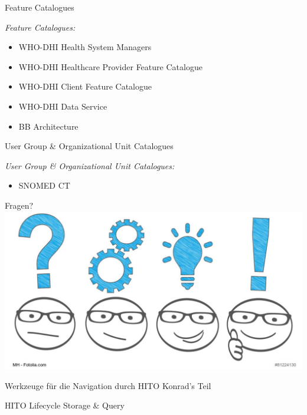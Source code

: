 \documentclass[aspectratio=1610,12pt]{beamer}
\begin{document}
\begin{frame}{Feature Catalogues}
\begin{spacing}{1.25}
  \emph{Feature Catalogues:}
  \begin{itemize}
    \item WHO-DHI Health System Managers
    \item WHO-DHI Healthcare Provider Feature Catalogue
    \item WHO-DHI Client Feature Catalogue
    \item WHO-DHI Data Service
    \item BB Architecture
  \end{itemize}
  \end{spacing}
\end{frame}

\begin{frame}{User Group \& Organizational Unit Catalogues}
\begin{spacing}{1.25}
  \emph{User Group \& Organizational Unit Catalogues:}
  \begin{itemize}
    \item SNOMED CT
  \end{itemize}
  \end{spacing}
\end{frame}

\begin{frame}{Fragen?}
  \centering
  \vspace{-0.5cm}
  \includegraphics[width=\textwidth]{img/fragen.png}
\end{frame}

\begin{frame}{Werkzeuge für die Navigation durch HITO}
  \centering
  \huge Konrad's Teil
\end{frame}

\begin{frame}{HITO Lifecycle Storage \& Query}
 \centering
  \vspace{-0.5cm}
\end{frame}
\end{document}
